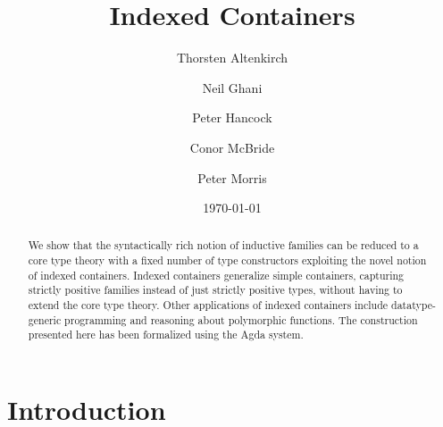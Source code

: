 \documentclass[a4paper]{article}
\begin{document}

\newtheorem{proposition}[theorem]{Proposition}
\newenvironment{proof}[1][Proof]{\begin{trivlist}
\item[\hskip \labelsep {\bfseries #1}]}{\end{trivlist}}

\title{Indexed Containers}
\author{Thorsten Altenkirch 
   \and Neil Ghani 
   \and Peter Hancock 
   \and Conor McBride 
   \and Peter Morris}
\date{\today}

\maketitle

\begin{abstract}

  We show that the syntactically rich notion of inductive families can
  be reduced to a core type theory with a fixed number of type
  constructors exploiting the novel notion of indexed containers.
  Indexed containers generalize simple containers, capturing strictly
  positive families instead of just strictly positive types, without
  having to extend the core type theory. Other applications of indexed
  containers include datatype-generic programming and reasoning about
  polymorphic functions. The construction presented here has been
  formalized using the Agda system.

\end{abstract}



\section{Introduction}
\end{document}
